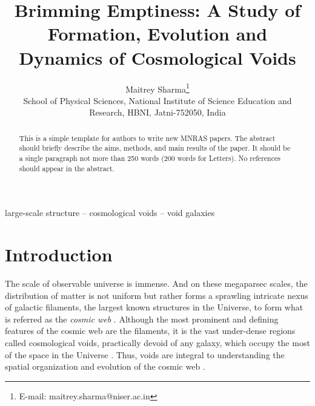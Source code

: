 \documentclass[fleqn,usenatbib]{mnras}
\title[Cosmic Voids]{Brimming Emptiness: A Study of Formation, Evolution and Dynamics of Cosmological Voids}
\author[Maitrey Sharma]{
Maitrey Sharma\thanks{E-mail: maitrey.sharma@niser.ac.in}
\\
School of Physical Sciences, National Institute of Science Education and Research, HBNI, Jatni-752050, India\\
}
\begin{document}
\label{firstpage}
\pagerange{\pageref{firstpage}--\pageref{lastpage}}
\maketitle

\begin{abstract}
This is a simple template for authors to write new MNRAS papers.
The abstract should briefly describe the aims, methods, and main results of the paper.
It should be a single paragraph not more than 250 words (200 words for Letters).
No references should appear in the abstract.
\end{abstract}

\begin{keywords}
large-scale structure -- cosmological voids -- void galaxies
\end{keywords}



\section{Introduction}

The scale of observable universe is immense. And on these megaparsec scales, the distribution of matter is not uniform but rather forms a sprawling intricate nexus of galactic filaments, the largest known structures in the Universe, to form what is referred as the \textit{cosmic web} \citep{bond_how_1996}. Although the most prominent and defining features of the cosmic web are the filaments, it is the vast under-dense regions called cosmological voids, practically devoid of any galaxy, which occupy the most of the space in the Universe \citep{libeskind_tracing_2018, van_de_weygaert_voids_2014}. Thus, voids are integral to understanding the spatial organization and evolution of the cosmic web \citep{icke_voids_1984, sahni_evolution_1994, sheth_hierarchy_2004, einasto_wavelet_2011, aragon-calvo_hierarchical_2013}. 
\end{document}
